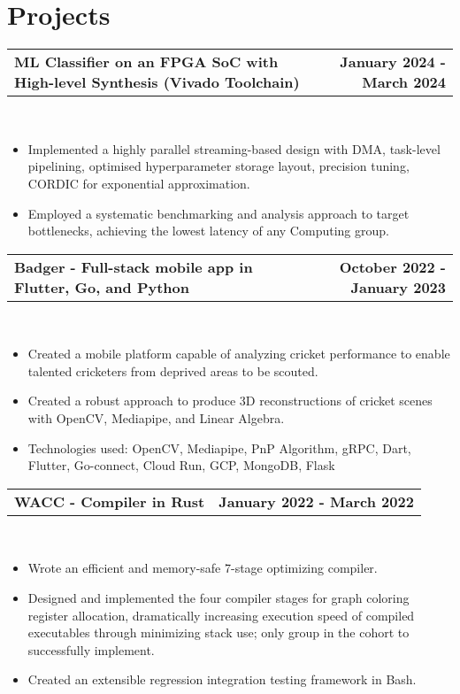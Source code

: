 \documentclass[letterpaper,oneside,10.8pt]{article}
\makeatletter
\newcommand{\titleAndDate}[2]{
  \small{
  \vspace{-1pt}
    \begin{tabular*}{1\textwidth}{l@{\extracolsep{\fill}}r}
      \textbf{#1} & \textbf{#2} \\
    \end{tabular*}\vspace{-1pt} \\
  }
}
\newcommand{\normalText}[1]{
  \small{
    {#1}
  }\vspace{-1pt}\\
}
\makeatother
\begin{document}


\section{Projects}

\titleAndDate{ML Classifier on an FPGA SoC with High-level Synthesis (Vivado Toolchain)}{January 2024 - March 2024}
\begin{itemize}[leftmargin=10pt]
    \item\normalText{Implemented a highly parallel streaming-based design with DMA, task-level pipelining, optimised hyperparameter storage layout, precision tuning, CORDIC for exponential approximation.}
    \item\normalText{Employed a systematic benchmarking and analysis approach to target bottlenecks, achieving the lowest latency of any Computing group.}
\end{itemize}

\vspace{3pt}

\titleAndDate{Badger - Full-stack mobile app in Flutter, Go, and Python}{October 2022 - January 2023}
\begin{itemize}[leftmargin=10pt]
    \item\normalText{Created a mobile platform capable of analyzing cricket performance to enable talented cricketers from deprived areas to be scouted. }
    \item\normalText{Created a robust approach to produce 3D reconstructions of cricket scenes with OpenCV, Mediapipe, and Linear Algebra. }
    \item\normalText{Technologies used: OpenCV, Mediapipe, PnP Algorithm, gRPC, Dart, Flutter, Go-connect, Cloud Run, GCP, MongoDB, Flask}
\end{itemize}

\vspace{3pt}

\titleAndDate{WACC - Compiler in Rust}{January 2022 - March 2022}
\begin{itemize}[leftmargin=10pt]
    \item\normalText{Wrote an efficient and memory-safe 7-stage optimizing compiler. }
    \item\normalText{Designed and implemented the four compiler stages for graph coloring register allocation, dramatically increasing execution speed of compiled executables through minimizing stack use; only group in the cohort to successfully implement.}
    \item\normalText{Created an extensible regression integration testing framework in Bash. }
\end{itemize}
\end{document}
